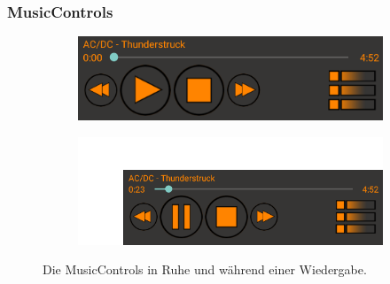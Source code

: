 \documentclass[FIPLY_base.tex]{subfiles}
\begin{document}
\newpage
\subsubsection {MusicControls}

\begin{figure}[H]
	\begin{subfigure}[b]{0.3\textwidth}
	\includegraphics[scale=0.55]{img/musicControls}
	\end{subfigure}
	\hfil
	\begin{subfigure}[b]{0.3\textwidth}
	\includegraphics[scale=0.55]{img/musicControlsPlaying}
	\end{subfigure}
	\caption{Die MusicControls in Ruhe und während einer Wiedergabe.}
\end{figure}
\end{document}
